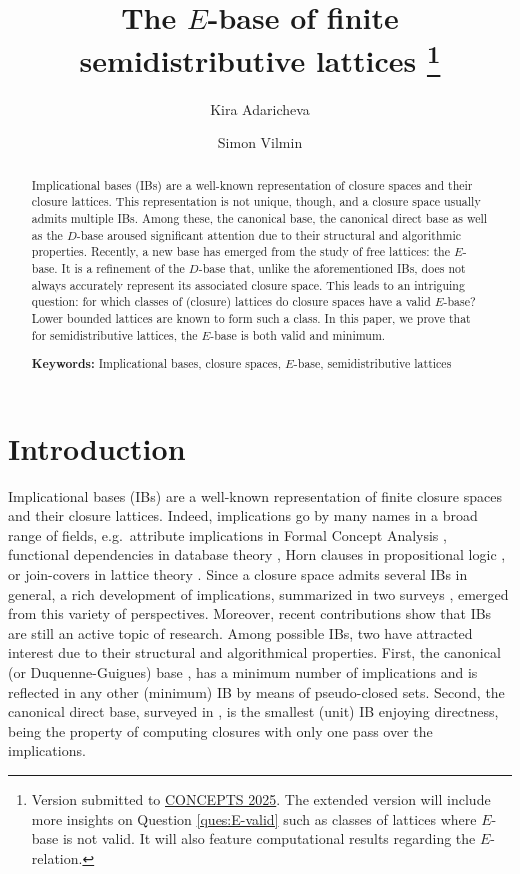 \documentclass[12pt, a4paper]{article}
\title{The $E$-base of finite semidistributive lattices%
\footnote{Version submitted to \href{https://concepts2025.conference.ubbcluj.ro/}{CONCEPTS 2025}. The extended version will include more insights on Question \ref{ques:E-valid} such as classes of lattices where $E$-base is not valid.
It will also feature computational results regarding the $E$-relation.}}
\author[1]{Kira Adaricheva}
\author[2]{Simon Vilmin}
\affil[1]{Department of Mathematics, Hofstra University, Hempstead, NY 11549, USA.}
\affil[2]{Aix-Marseille Université, CNRS, LIS, Marseille, France.}
\def\arxiv{1}
\begin{document}
\maketitle


\begin{abstract}
Implicational bases (IBs) are a well-known representation of closure spaces and their closure lattices.
This representation is not unique, though, and a closure space usually admits multiple IBs.
Among these, the canonical base, the canonical direct base as well as the $D$-base aroused significant attention due to their structural and algorithmic properties.
Recently, a new base has emerged from the study of free lattices: the $E$-base.
It is a refinement of the $D$-base that, unlike the aforementioned IBs, does not always accurately represent its associated closure space.
This leads to an intriguing question: for which classes of (closure) lattices do closure spaces have a valid $E$-base?
Lower bounded lattices are known to form such a class.
In this paper, we prove that for semidistributive lattices, the $E$-base is both valid and minimum.

\ifx\arxiv\undefined
{}
\else
\vspace{.5em}
\noindent \textbf{Keywords:} Implicational bases, closure spaces, $E$-base, semidistributive lattices
\fi
\end{abstract}


\section{Introduction}

Implicational bases (IBs) are a well-known representation of finite closure spaces and their closure lattices. 
Indeed, implications go by many names in a broad range of fields, e.g.\ attribute implications in Formal Concept Analysis \cite{ganter2012formal}, functional dependencies in database theory \cite{maier1980minimum,mannila1992design}, Horn clauses in propositional logic \cite{crama2011boolean}, or join-covers in lattice theory \cite{freese1995free,gratzer2011lattice}.
Since a closure space admits several IBs in general, a rich development of implications, summarized in two surveys \cite{bertet2018lattices,wild2017joy}, emerged from this variety of perspectives.
Moreover, recent contributions \cite{adaricheva2024computing,berczi2024hypergraph,bichoupan2023independence} show that IBs are still an active topic of research.
Among possible IBs, two have attracted interest due to their structural and algorithmical properties.
First, the canonical (or Duquenne-Guigues) base \cite{guigues1986familles,wild1994theory,day1992lattice}, has a minimum number of implications and is reflected in any other (minimum) IB by means of pseudo-closed sets.
Second, the canonical direct base, surveyed in \cite{bertet2010multiple}, is the smallest (unit) IB enjoying directness, being the property of computing closures with only one pass over the implications.
\end{document}
